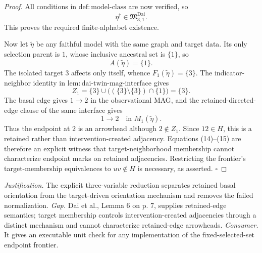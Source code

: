 \documentclass{article}
\begin{document}
\begin{proof}
All conditions in \(\mathrm{def:model\mbox{-}class}\) are now verified, so
\[
 \eta^\dagger\in\mathfrak M_{3,1}^{\mathrm{Dai}}.
 \tag{12}
\]
This proves the required finite-alphabet existence.

Now let \(\widetilde\eta\) be any faithful model with the same graph and target data.  Its only selection parent is \(1\), whose inclusive ancestral set is \(\{1\}\), so
\[
 A(\widetilde\eta)=\{1\}.
 \tag{13}
\]
The isolated target \(3\) affects only itself, whence \(F_1(\widetilde\eta)=\{3\}\).  The indicator-neighbor identity in \(\mathrm{lem:dai\mbox{-}twin\mbox{-}mag\mbox{-}interface}\) gives
\[
 Z_1
 =\{3\}\cup\bigl((\{3\}\setminus\{3\})\cap\{1\}\bigr)
 =\{3\}.
 \tag{14}
\]
The basal edge gives \(1\to2\) in the observational MAG, and the retained-directed-edge clause of the same interface gives
\[
 1\to2\quad\text{in }M_1(\widetilde\eta).
 \tag{15}
\]
Thus the endpoint at \(2\) is an arrowhead although \(2\notin Z_1\).  Since \(12\in H\), this is a retained rather than intervention-created adjacency.  Equations (14)--(15) are therefore an explicit witness that target-neighborhood membership cannot characterize endpoint marks on retained adjacencies.  Restricting the frontier's target-membership equivalences to \(uv\notin H\) is necessary, as asserted.  \(\square\)
\end{proof}
\par\smallskip\noindent \textit{Justification.} The explicit three-variable reduction separates retained basal orientation from the target-driven orientation mechanism and removes the failed normalization. \textit{Gap.} Dai et al., Lemma 6 on p. 7, supplies retained-edge semantics; target membership controls intervention-created adjacencies through a distinct mechanism and cannot characterize retained-edge arrowheads. \textit{Consumer.} It gives an executable unit check for any implementation of the fixed-selected-set endpoint frontier.
\end{document}
